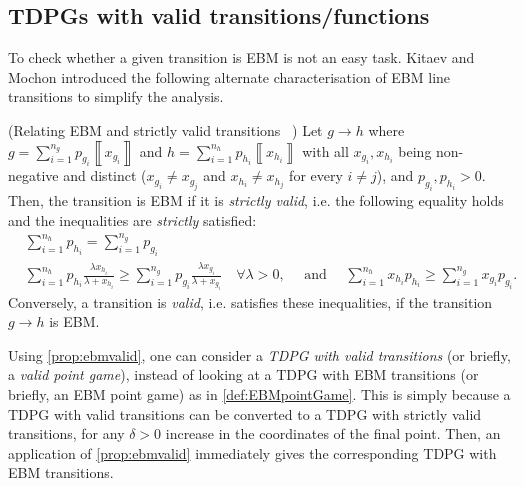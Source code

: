 \documentclass{article}
\begin{document}
%
%


\subsection{TDPGs with valid transitions/functions}
\label{subsec:tdpgvalid}
To check whether a given transition is EBM is not an easy task. Kitaev and Mochon \cite{Mochon07} introduced the following
alternate characterisation of EBM line
transitions to simplify the analysis.
%

\begin{proposition}(Relating EBM and strictly valid transitions ~\cite{Mochon07,ACG+14})
  \label{prop:ebmvalid}
  Let $g\to h$ where $g=\sum_{i=1}^{n_{g}}p_{g_{i}}\left\llbracket x_{g_{i}}\right\rrbracket $
  and $h=\sum_{i=1}^{n_{h}}p_{h_{i}}\left\llbracket x_{h_{i}}\right\rrbracket $
  with all $x_{g_{i}},x_{h_{i}}$ being non-negative and distinct ($x_{g_{i}}\neq x_{g_{j}}$
  and $x_{h_{i}}\neq x_{h_{j}}$ for every $i\neq j$), and $p_{g_{i}},p_{h_{i}}>0$. Then, the transition is EBM if it is \emph{strictly
    valid}, i.e. the following equality holds and the inequalities are
  \emph{strictly} satisfied:
  \begin{align*}
     & \sum_{i=1}^{n_{h}}p_{h_{i}}  =\sum_{i=1}^{n_{g}}p_{g_{i}}                                                                                                                                       \\
     & \sum_{i=1}^{n_{h}}p_{h_{i}}\frac{\lambda x_{h_{i}}}{\lambda+x_{h_{i}}}  \ge\sum_{i=1}^{n_{g}}p_{g_{i}}\frac{\lambda x_{g_{i}}}{\lambda+x_{g_{i}}} \quad\forall\lambda>0, \quad\text{ and }\quad
    \sum_{i=1}^{n_{h}}x_{h_{i}}p_{h_{i}}  \ge\sum_{i=1}^{n_{g}}x_{g_{i}}p_{g_{i}}.
  \end{align*}
  Conversely, a transition is \emph{valid}, i.e. satisfies these inequalities, if the transition $g\to h$ is EBM.
\end{proposition}

%
%
%
%
%
%
%
%
%

%
Using \cref{prop:ebmvalid}, one can consider a \emph{TDPG with valid transitions} (or briefly, a \emph{valid point game}), instead of looking at a TDPG with EBM transitions (or briefly, an EBM point game) as in \cref{def:EBMpointGame}. This is simply because a TDPG with valid transitions can be converted to a TDPG with strictly valid transitions, for any $\delta>0$ increase in the coordinates of the final point. Then, an application of \cref{prop:ebmvalid} immediately gives the corresponding TDPG with EBM transitions.
\end{document}
